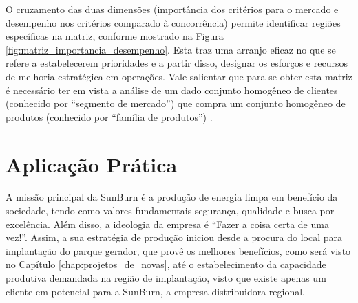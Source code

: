 O cruzamento das duas dimensões (importância dos critérios para o mercado e desempenho nos critérios comparado à concorrência) permite identificar regiões específicas na matriz, conforme mostrado na Figura \ref{fig:matriz_importancia_desempenho}. Esta traz uma arranjo eficaz no que se refere a estabelecerem prioridades e a partir disso, designar os esforços e recursos de melhoria estratégica em operações. Vale salientar que para se obter esta matriz é necessário ter em vista a análise de um dado conjunto homogêneo de clientes (conhecido por ``segmento de mercado'') que compra um conjunto homogêneo de produtos (conhecido por ``família de produtos'') \cite{correa2000administracao}.



\section{Aplicação Prática}
\label{sec:estrategia_da_producao_aplicacao}
A missão principal da SunBurn é a produção de energia limpa em benefício da sociedade, tendo como valores fundamentais segurança, qualidade e busca por excelência. Além disso, a ideologia da empresa é ``Fazer a coisa certa de uma vez!''. Assim, a sua estratégia de produção iniciou desde a procura do local para implantação do parque gerador, que provê os melhores benefícios, como será visto no Capítulo \ref{chap:projetos_de_novas}, até o estabelecimento da capacidade produtiva demandada na região de implantação, visto que existe apenas um cliente em potencial para a SunBurn, a empresa distribuidora regional.


